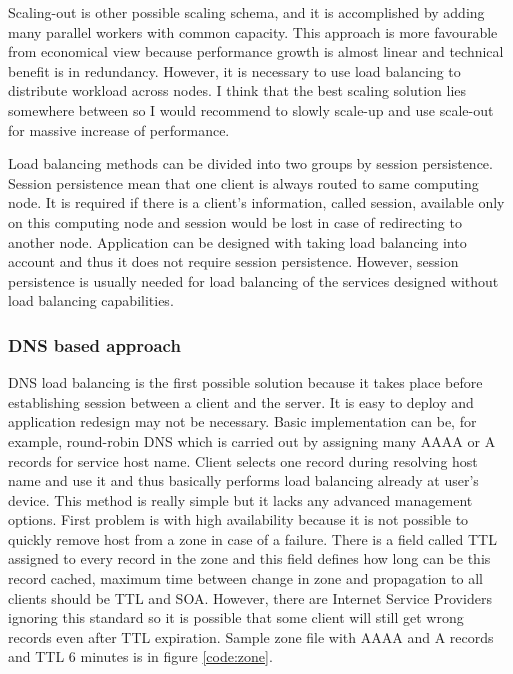 Scaling-out is other possible scaling schema, and it is accomplished by adding many parallel workers with common capacity. This approach is more favourable from economical view because performance growth is almost linear and technical benefit is in redundancy. However, it is necessary to use load balancing to distribute workload across nodes. I think that the best scaling solution lies somewhere between so I would recommend to slowly scale-up and use scale-out for massive increase of performance.

Load balancing methods can be divided into two groups by session persistence. Session persistence mean that one client is always routed to same computing node. It is required if there is a client's information, called session, available only on this computing node and session would be lost in case of redirecting to another node. Application can be designed with taking load balancing into account and thus it does not require session persistence. However, session persistence is usually needed for load balancing of the services designed without load balancing capabilities.

\subsubsection{DNS based approach}
\Ac{DNS} load balancing is the first possible solution because it takes place before establishing session between a client and the server. It is easy to deploy and application redesign may not be necessary. Basic implementation can be, for example, round-robin \Ac{DNS} which is carried out by assigning many AAAA or A records for service host name. Client selects one record during resolving host name and use it and thus basically performs load balancing already at user's device. This method is really simple but it lacks any advanced management options. First problem is with high availability because it is not possible to quickly remove host from a zone in case of a failure. There is a field called \Ac{TTL} assigned to every record in the zone and this field defines how long can be this record cached, maximum time between change in zone and propagation to all clients should be \Ac{TTL} and \Ac{SOA}. However, there are Internet Service Providers ignoring this standard so it is possible that some client will still get wrong records even after \Ac{TTL} expiration. Sample zone file with AAAA and A records and \Ac{TTL} 6 minutes is in figure \ref{code:zone}.

